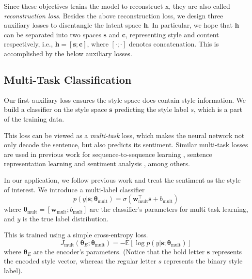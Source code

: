 \documentclass[11pt,a4paper]{article}
\newcommand{\rmx}{\mathrm x}
\newcommand{\loss}[1]{J_\text{#1}}
\begin{document}
Since these objectives trains the model to reconstruct $\rmx$, they are also called \textit{reconstruction loss}. Besides the above reconstruction loss, we design three auxiliary losses to disentangle the latent space $\bm h$. In particular, we hope that $\bm h$ can be separated into two spaces $\bm s$ and $\bm c$, representing style and content respectively, i.e., $\bm h = [\bm s ; \bm c]$, where $[\cdot;\cdot]$ denotes concatenation. This is accomplished by the below auxiliary losses.


\subsection{Multi-Task Classification} \label{ss:multi}

Our first auxiliary loss ensures the style space does contain style information. We build a classifier on the style space $\bm s$ predicting the style label $s$, which is a part of the training data.

This loss can be viewed as a \textit{multi-task} loss, which makes the neural network not only decode the sentence, but also predicts its sentiment. Similar multi-task losses are used in previous work for sequence-to-sequence learning \cite{luong2015multi}, sentence representation learning \cite{jernite2017discourse} and sentiment analysis \cite{balikas2017multitask}, among others.

In our application, we follow previous work \cite{hu2017toward,shen2017style,fu2017style} and treat the sentiment as the style of interest. We introduce a multi-label classifier
\begin{equation} \label{eqn:class-pred}
	p(y | \bm s; \bm\theta_\text{mult}) = \sigma(\bm w_\text{mult}^\top \bm s + b_\text{mult})
\end{equation}
where $\bm\theta_\text{mult}=[\bm w_\text{mult}; b_\text{mult}]$ are the classifier's parameters for multi-task learning, and $y$ is the true label distribution.

This is trained using a simple cross-entropy loss.
\begin{equation} \label{eqn:multi-task-loss}
	\loss{mult}(\bm\theta_{E};\bm\theta_\text{mult}) =
	- \mathbb{E} [\log p(y | \bm s; \bm\theta_\text{mult})]
\end{equation}
where $\bm\theta_E$ are the encoder's parameters. (Notice that the bold letter $\bm s$ represents the encoded style vector, whereas the regular letter $s$ represents the binary style label).
\end{document}
